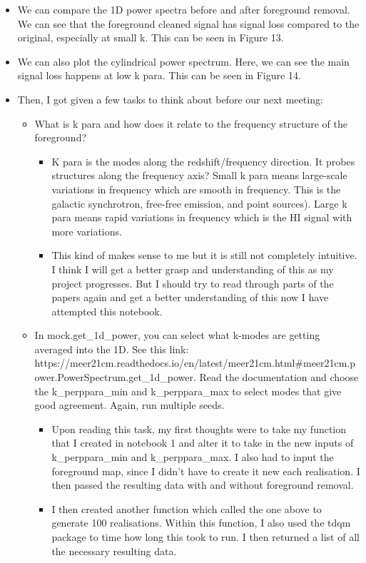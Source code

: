 \begin{itemize}
    \item We can compare the 1D power spectra before and after foreground removal. We can see that the foreground cleaned signal has signal loss compared to the original, especially at small k. This can be seen in Figure 13.
    \item We can also plot the cylindrical power spectrum. Here, we can see the main signal loss happens at low k para. This can be seen in Figure 14.
    \item Then, I got given a few tasks to think about before our next meeting:
    \begin{itemize}
        \item What is k para and how does it relate to the frequency structure of the foreground?
        \begin{itemize}
            \item K para is the modes along the redshift/frequency direction. It probes structures along the frequency axis? Small k para means large-scale variations in frequency which are smooth in frequency. This is the galactic synchrotron, free-free emission, and point sources). Large k para means rapid variations in frequency which is the HI signal with more variations.
            \item This kind of makes sense to me but it is still not completely intuitive. I think I will get a better grasp and understanding of this as my project progresses. But I should try to read through parts of the papers again and get a better understanding of this now I have attempted this notebook.
        \end{itemize}
        \item In mock.get\_1d\_power, you can select what k-modes are getting averaged into the 1D. See this link: https://meer21cm.readthedocs.io/en/latest/meer21cm.html\#meer21cm.power.PowerSpectrum.get\_1d\_power. Read the documentation and choose the k\_perppara\_min and k\_perppara\_max to select modes that give good agreement. Again, run multiple seeds.
        \begin{itemize}
            \item Upon reading this task, my first thoughts were to take my function that I created in notebook 1 and alter it to take in the new inputs of k\_perppara\_min and k\_perppara\_max. I also had to input the foreground map, since I didn't have to create it new each realisation. I then passed the resulting data with and without foreground removal.
            \item I then created another function which called the one above to generate 100 realisations. Within this function, I also used the tdqm package to time how long this took to run. I then returned a list of all the necessary resulting data.

\end{itemize}
\end{itemize}
\end{itemize}
